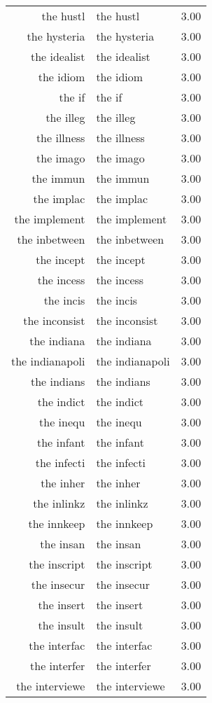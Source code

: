 \begin{table}[ht]
\begin{tabular}{rlr}
  the hustl & the hustl & 3.00 \\ 
  the hysteria & the hysteria & 3.00 \\ 
  the idealist & the idealist & 3.00 \\ 
  the idiom & the idiom & 3.00 \\ 
  the if & the if & 3.00 \\ 
  the illeg & the illeg & 3.00 \\ 
  the illness & the illness & 3.00 \\ 
  the imago & the imago & 3.00 \\ 
  the immun & the immun & 3.00 \\ 
  the implac & the implac & 3.00 \\ 
  the implement & the implement & 3.00 \\ 
  the inbetween & the inbetween & 3.00 \\ 
  the incept & the incept & 3.00 \\ 
  the incess & the incess & 3.00 \\ 
  the incis & the incis & 3.00 \\ 
  the inconsist & the inconsist & 3.00 \\ 
  the indiana & the indiana & 3.00 \\ 
  the indianapoli & the indianapoli & 3.00 \\ 
  the indians & the indians & 3.00 \\ 
  the indict & the indict & 3.00 \\ 
  the inequ & the inequ & 3.00 \\ 
  the infant & the infant & 3.00 \\ 
  the infecti & the infecti & 3.00 \\ 
  the inher & the inher & 3.00 \\ 
  the inlinkz & the inlinkz & 3.00 \\ 
  the innkeep & the innkeep & 3.00 \\ 
  the insan & the insan & 3.00 \\ 
  the inscript & the inscript & 3.00 \\ 
  the insecur & the insecur & 3.00 \\ 
  the insert & the insert & 3.00 \\ 
  the insult & the insult & 3.00 \\ 
  the interfac & the interfac & 3.00 \\ 
  the interfer & the interfer & 3.00 \\ 
  the interviewe & the interviewe & 3.00 \\ 

\end{tabular}
\end{table}
